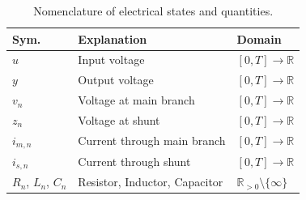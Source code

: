 \begin{table}[hb!]
	\centering
	\renewcommand{\arraystretch}{1.3}
	\selectfont
	\begin{tabular}{lll}
		\toprule
		\textbf{Sym.} & \textbf{Explanation}  & \textbf{Domain}  \\
		\midrule
		$u$ & Input voltage & $[0,T] \rightarrow \mathbb{R}$ \\
		$y$ & Output voltage & $[0,T] \rightarrow \mathbb{R}$ \\
		$v_{n}$ & Voltage at main branch & $[0,T] \rightarrow \mathbb{R}$ \\
		$z_{n}$ & Voltage at shunt & $[0,T] \rightarrow \mathbb{R}$ \\
		$i_{m,n}$ & Current through main branch & $[0,T] \rightarrow \mathbb{R}$ \\
		$i_{s,n}$ & Current through shunt & $[0,T] \rightarrow \mathbb{R}$ \\
		$R_{n}$, $L_{n}$, $C_{n}$ & Resistor, Inductor, Capacitor & $\mathbb{R}_{>0} \setminus \{\infty\}$ \\
		\bottomrule
	\end{tabular}
	\caption{Nomenclature of electrical states and quantities.}
	\label{table:el_symbols_explanation}
\end{table}

